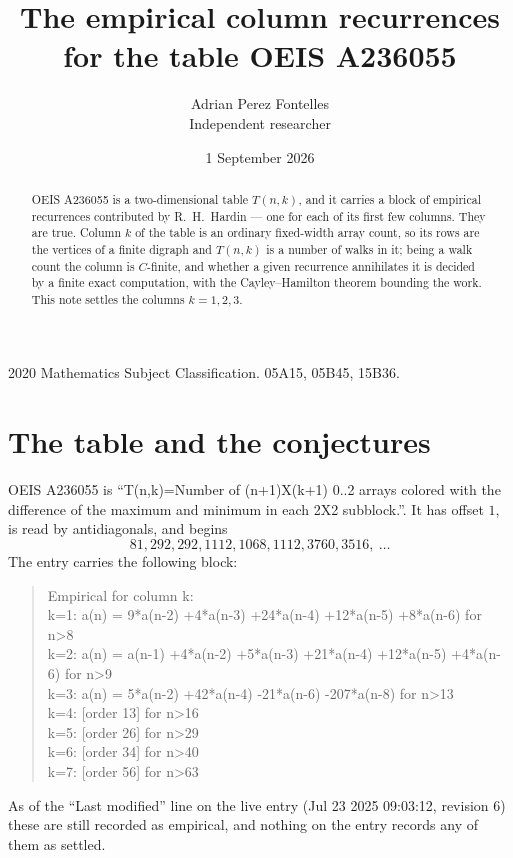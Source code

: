 \documentclass[11pt,a4paper]{article}
\title{The empirical column recurrences for the table OEIS A236055}
\author{Adrian Perez Fontelles\\ \small Independent researcher}
\date{1 September 2026}
\theoremstyle{plain}
\theoremstyle{definition}
\begin{document}
\maketitle

\begin{abstract}
OEIS A236055 is a two-dimensional table $T(n,k)$, and it carries a block of empirical
recurrences contributed by R.~H.~Hardin --- one for each of its first few columns. They are
true. Column $k$ of the table is an ordinary fixed-width array count, so its rows are the
vertices of a finite digraph and $T(n,k)$ is a number of walks in it; being a walk count the
column is $C$-finite, and whether a given recurrence annihilates it is decided by a finite
exact computation, with the Cayley--Hamilton theorem bounding the work. This note settles the columns $k=1, 2, 3$.
\end{abstract}

\noindent\small 2020 Mathematics Subject Classification. 05A15, 05B45, 15B36.\normalsize

\section{The table and the conjectures}

OEIS A236055 is ``T(n,k)=Number of (n+1)X(k+1) 0..2 arrays colored with the difference of the maximum and minimum in each 2X2 subblock.''. It has offset $1$, is
read by antidiagonals, and begins
\[
81, 292, 292, 1112, 1068, 1112, 3760, 3516,\ \dots
\]
The entry carries the following block:
\begin{quote}\small
Empirical for column k:\\
k=1: a(n) = 9*a(n-2) +4*a(n-3) +24*a(n-4) +12*a(n-5) +8*a(n-6) for n>8\\
k=2: a(n) = a(n-1) +4*a(n-2) +5*a(n-3) +21*a(n-4) +12*a(n-5) +4*a(n-6) for n>9\\
k=3: a(n) = 5*a(n-2) +42*a(n-4) -21*a(n-6) -207*a(n-8) for n>13\\
k=4: [order 13] for n>16\\
k=5: [order 26] for n>29\\
k=6: [order 34] for n>40\\
k=7: [order 56] for n>63\\
\end{quote}
As of the ``Last modified'' line on the live entry (Jul 23 2025 09:03:12, revision 6) these are still
recorded as empirical, and nothing on the entry records any of them as settled.
\end{document}
